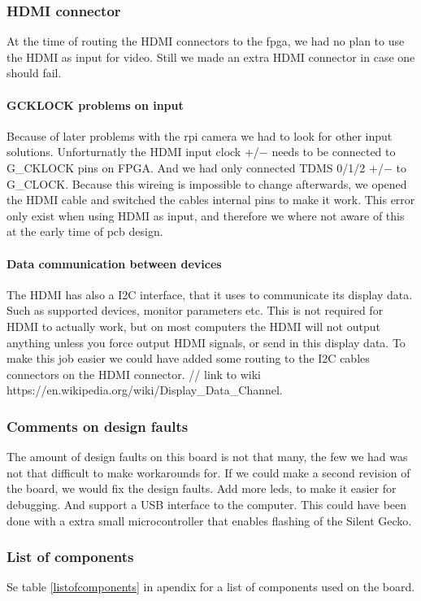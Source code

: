\subsubsection{HDMI connector}
At the time of routing the HDMI connectors to the fpga, we had no plan to use the HDMI as input for video. Still we made an extra HDMI connector in case one should fail. 

\paragraph{GCKLOCK problems on input}
Because of later problems with the rpi camera we had to look for other input solutions. Unforturnatly the HDMI input clock $+$/$-$ needs to be connected to G\_CKLOCK pins on FPGA. And we had only connected TDMS 0/1/2 $+$/$-$ to G\_CLOCK. Because this wireing is impossible to change afterwards, we opened the HDMI cable and switched the cables internal pins to make it work. This error only exist when using HDMI as input, and therefore we where not aware of this at the early time of pcb design. 
\paragraph{Data communication between devices}
The HDMI has also a I2C interface, that it uses to communicate its display data. Such as supported devices, monitor parameters etc. This is not required for HDMI to actually work, but on most computers the HDMI will not output anything unless you force output HDMI signals, or send in this display data. To make this job easier we could have added some routing to the I2C cables connectors on the HDMI connector. // link to wiki https://en.wikipedia.org/wiki/Display\_Data\_Channel.
\subsubsection{Comments on design faults}
The amount of design faults on this board is not that many, the few we had was not that difficult to make workarounds for. If we could make a second revision of the board, we would fix the design faults. Add more leds, to make it easier for debugging. And support a USB interface to the computer. This could have been done with a extra small microcontroller that enables flashing of the Silent Gecko.

\subsubsection{List of components}
Se table \ref{listofcomponents} in apendix for a list of components used on the board.

